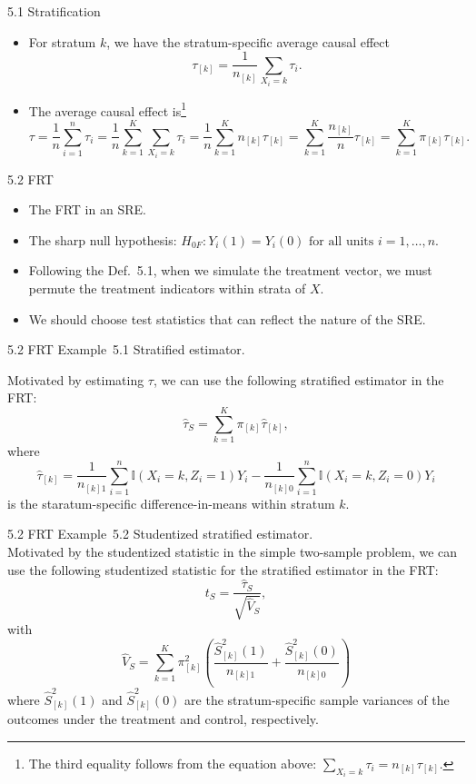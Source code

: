 \documentclass[aspectratio=169, 12pt]{beamer}
\begin{document}
\begin{frame}{5.1 Stratification}
  \begin{itemize}
    \item For stratum $k$, we have the stratum-specific average causal effect
    \[
    \tau_{[k]} = \frac{1}{n_{[k]}}\sum_{X_i=k}^{}\tau_i.
    \]
    \item The average causal effect is\footnote{The third equality follows from the equation above: $\sum_{X_i=k}^{}\tau_i=n_{[k]}\tau_{[k]}$.}
    \[
    \tau = \frac{1}{n}\sum_{i=1}^{n}\tau_i = \frac{1}{n}\sum_{k=1}^{K}\sum_{X_i=k}^{}\tau_i=\frac{1}{n}\sum_{k=1}^{K}n_{[k]}\tau_{[k]}=\sum_{k=1}^{K}\frac{n_{[k]}}{n}\tau_{[k]}=\sum_{k=1}^{K}\pi_{[k]}\tau_{[k]}.
    \]
  \end{itemize}
\end{frame}

\begin{frame}{5.2 FRT}
  \begin{itemize}
    \item The FRT in an SRE.
    \item The sharp null hypothesis: $H_{0F}:Y_i(1)=Y_i(0)\text{ for all units }i=1,\dots,n.$
    \item Following the Def.~5.1, when we simulate the treatment vector, we must permute the treatment indicators within strata of $X$.
    \item We should choose test statistics that can reflect the nature of the SRE.
  \end{itemize}
\end{frame}

\begin{frame}{5.2 FRT}
  Example~5.1 Stratified estimator.\\
  {

    Motivated by estimating $\tau$, we can use the following stratified estimator in the FRT:
    \[
    \widehat{\tau}_S=\sum_{k=1}^{K}\pi_{[k]}\widehat{\tau}_{[k]},
    \]
    where
    \[
    \widehat{\tau}_{[k]} = \frac{1}{n_{[k]1}}\sum_{i=1}^{n}\mathbb{I}(X_i=k,Z_i=1)Y_i - \frac{1}{n_{[k]0}}\sum_{i=1}^{n}\mathbb{I}(X_i=k,Z_i=0)Y_i
    \]
    is the staratum-specific difference-in-means within stratum $k$.
  }
\end{frame}

\begin{frame}{5.2 FRT}
  Example~5.2 Studentized stratified estimator.\\

  Motivated by the studentized statistic in the simple two-sample problem, we can use the following studentized statistic for the stratified estimator in the FRT:
  \[
  t_S = \frac{\widehat{\tau}_S}{\sqrt{\widehat{V}_S}},
  \]
  with
  \[
  \widehat{V}_S=\sum_{k=1}^{K}\pi_{[k]}^2\left(\frac{\widehat{S}_{[k]}^2(1)}{n_{[k]1}}+\frac{\widehat{S}_{[k]}^2(0)}{n_{[k]0}}\right)
  \]
  where $\widehat{S}_{[k]}^2(1)$ and $\widehat{S}_{[k]}^2(0)$ are the stratum-specific sample variances of the outcomes under the treatment and control, respectively.
\end{frame}
\end{document}
